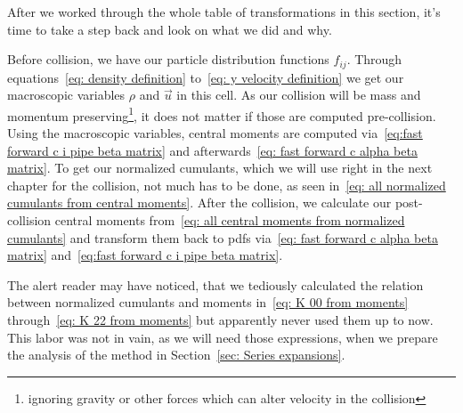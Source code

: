 
After we worked through the whole table of transformations in this section, it's time to take a step back and look on what we did and why.

Before collision, we have our particle distribution functions $f_{ij}$.
Through equations~\eqref{eq: density definition} to~\eqref{eq: y velocity definition} we get our macroscopic variables $\rho$ and $\vec{u}$ in this cell.
As our collision will be mass and momentum preserving\footnote{ignoring gravity or other forces which can alter velocity in the collision}, it does not matter if those are computed pre-collision.
Using the macroscopic variables, central moments are computed via~\eqref{eq:fast forward c i pipe beta matrix} and afterwards~\eqref{eq: fast forward c alpha beta matrix}.
To get our normalized cumulants, which we will use right in the next chapter for the collision, not much has to be done, as seen in~\eqref{eq: all normalized cumulants from central moments}.
After the collision, we calculate our post-collision central moments from~\eqref{eq: all central moments from normalized cumulants}
and transform them back to \glspl{pdf} via~\eqref{eq: fast forward c alpha beta matrix} and~\eqref{eq:fast forward c i pipe beta matrix}.

The alert reader may have noticed, that we tediously calculated the relation between normalized cumulants and moments in~\eqref{eq: K 00 from moments} through~\eqref{eq: K 22 from moments} but apparently never used them up to now.
This labor was not in vain, as we will need those expressions, when we prepare the analysis of the method in Section~\ref{sec: Series expansions}.
